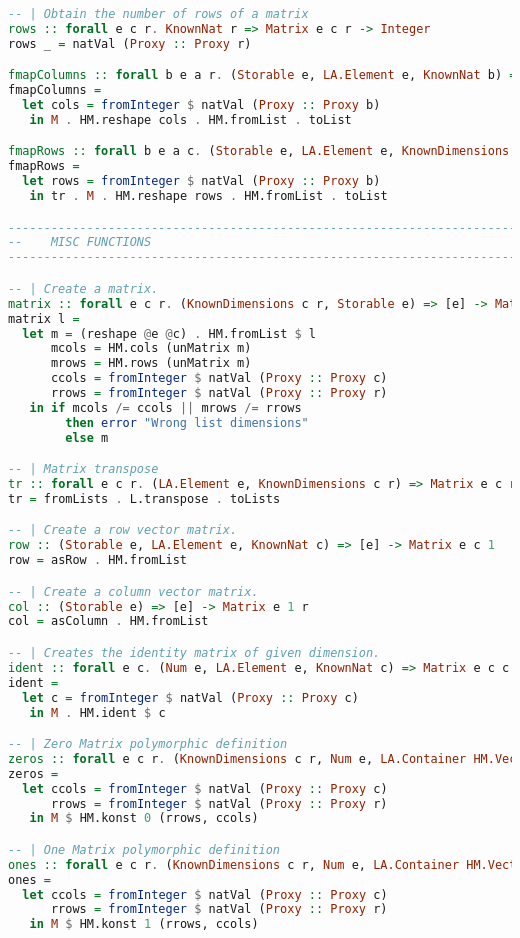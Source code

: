 \documentclass[
  oneside,
  11pt, a4paper,
  footinclude=true,
  headinclude=true,
  cleardoublepage=empty
]{scrbook}
\theoremstyle{definition}
\theoremstyle{definition}
\begin{document}
\begin{lstlisting}[language=Haskell, caption={Matrix.Internal},captionpos=b]
-- | Obtain the number of rows of a matrix
rows :: forall e c r. KnownNat r => Matrix e c r -> Integer
rows _ = natVal (Proxy :: Proxy r)

fmapColumns :: forall b e a r. (Storable e, LA.Element e, KnownNat b) => Matrix e a r -> Matrix e b r
fmapColumns =
  let cols = fromInteger $ natVal (Proxy :: Proxy b)
   in M . HM.reshape cols . HM.fromList . toList

fmapRows :: forall b e a c. (Storable e, LA.Element e, KnownDimensions c b) => Matrix e c a -> Matrix e c b
fmapRows =
  let rows = fromInteger $ natVal (Proxy :: Proxy b)
   in tr . M . HM.reshape rows . HM.fromList . toList

-------------------------------------------------------------------------------
--    MISC FUNCTIONS
-------------------------------------------------------------------------------

-- | Create a matrix.
matrix :: forall e c r. (KnownDimensions c r, Storable e) => [e] -> Matrix e c r
matrix l =
  let m = (reshape @e @c) . HM.fromList $ l
      mcols = HM.cols (unMatrix m)
      mrows = HM.rows (unMatrix m)
      ccols = fromInteger $ natVal (Proxy :: Proxy c)
      rrows = fromInteger $ natVal (Proxy :: Proxy r)
   in if mcols /= ccols || mrows /= rrows
        then error "Wrong list dimensions"
        else m

-- | Matrix transpose
tr :: forall e c r. (LA.Element e, KnownDimensions c r) => Matrix e c r -> Matrix e r c
tr = fromLists . L.transpose . toLists

-- | Create a row vector matrix.
row :: (Storable e, LA.Element e, KnownNat c) => [e] -> Matrix e c 1
row = asRow . HM.fromList

-- | Create a column vector matrix.
col :: (Storable e) => [e] -> Matrix e 1 r
col = asColumn . HM.fromList

-- | Creates the identity matrix of given dimension.
ident :: forall e c. (Num e, LA.Element e, KnownNat c) => Matrix e c c
ident =
  let c = fromInteger $ natVal (Proxy :: Proxy c)
   in M . HM.ident $ c

-- | Zero Matrix polymorphic definition
zeros :: forall e c r. (KnownDimensions c r, Num e, LA.Container HM.Vector e) => Matrix e c r
zeros =
  let ccols = fromInteger $ natVal (Proxy :: Proxy c)
      rrows = fromInteger $ natVal (Proxy :: Proxy r)
   in M $ HM.konst 0 (rrows, ccols)

-- | One Matrix polymorphic definition
ones :: forall e c r. (KnownDimensions c r, Num e, LA.Container HM.Vector e) => Matrix e c r
ones =
  let ccols = fromInteger $ natVal (Proxy :: Proxy c)
      rrows = fromInteger $ natVal (Proxy :: Proxy r)
   in M $ HM.konst 1 (rrows, ccols)


\end{lstlisting}
\end{document}
